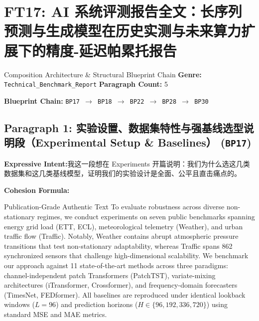 \section{FT17: AI 系统评测报告全文：长序列预测与生成模型在历史实测与未来算力扩展下的精度-延迟帕累托报告}\label{comp:FT17}
\begin{ConceptBox}{Composition Architecture \& Structural Blueprint Chain}
\textbf{Genre:} \texttt{Technical\_Benchmark\_Report} \quad \textbf{Paragraph Count:} 5\par
\textbf{Blueprint Chain:} \texttt{BP17 $\to$ BP18 $\to$ BP22 $\to$ BP28 $\to$ BP30}
\end{ConceptBox}
\subsection*{Paragraph 1: 实验设置、数据集特性与强基线选型说明段（Experimental Setup \& Baselines） (\texttt{BP17})}
\noindent\textbf{Expressive Intent:}\enspace 我这一段想在 Experiments 开篇说明：我们为什么选这几类数据集和这几类基线模型，证明我们的实验设计是全面、公平且直击痛点的。\par
\noindent\textbf{Cohesion Formula:}\par\vspace{4pt}
\begin{ExampleBox}{Publication-Grade Authentic Text}
To evaluate robustness across diverse non-stationary regimes, we conduct experiments on seven public benchmarks spanning energy grid load (ETT, ECL), meteorological telemetry (Weather), and urban traffic flow (Traffic). Notably, Weather contains abrupt atmospheric pressure transitions that test non-stationary adaptability, whereas Traffic spans 862 synchronized sensors that challenge high-dimensional scalability. We benchmark our approach against 11 state-of-the-art methods across three paradigms: channel-independent patch Transformers (PatchTST), variate-mixing architectures (iTransformer, Crossformer), and frequency-domain forecasters (TimesNet, FEDformer). All baselines are reproduced under identical lookback windows ($L=96$) and prediction horizons ($H \in \{96, 192, 336, 720\}$) using standard MSE and MAE metrics.
\end{ExampleBox}
